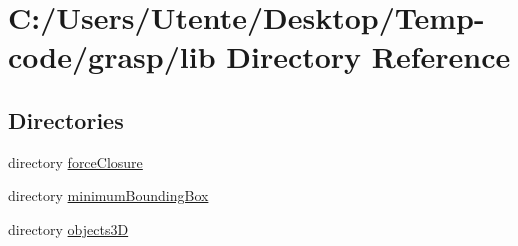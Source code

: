 \section{C\+:/\+Users/\+Utente/\+Desktop/\+Temp-\/code/grasp/lib Directory Reference}
\label{dir_e5894218bab233b884eaf4c98ee8dd03}
\subsection*{Directories}
\begin{DoxyCompactItemize}
\item 
directory \hyperlink{dir_d6e56311f0e79133104331dbab76800e}{force\+Closure}
\item 
directory \hyperlink{dir_4ddbe9f20cdf314645d6c5a25ef03f01}{minimum\+Bounding\+Box}
\item 
directory \hyperlink{dir_9dc847b3111d48001885bffbd4548fb3}{objects3\+D}
\end{DoxyCompactItemize}

